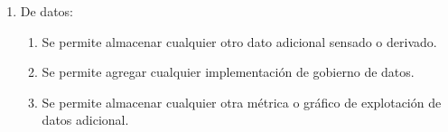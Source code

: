 \begin{enumerate}
\begin{enumerate}
			\item De datos:
				\begin{enumerate}			
					\item Se permite almacenar cualquier otro dato adicional sensado o derivado.
					\item Se permite agregar cualquier implementación de gobierno de datos.	
					\item Se permite almacenar cualquier otra métrica o gráfico de explotación de datos adicional.
				\end{enumerate}
		
	\end{enumerate}
\end{enumerate}
